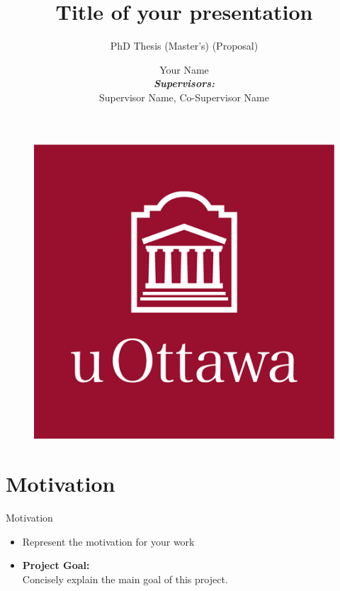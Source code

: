 \documentclass[xcolor=table]{beamer}
\author{{Your Name}\\
{\textit{\textbf{Supervisors:}}} \\
{Supervisor Name,} {Co-Supervisor Name}}
\title{Title of your presentation}
\subtitle{PhD Thesis (Master's) (Proposal)}
\institute{Department, University of Ottawa}
\begin{document}
\begin{frame}
    \titlepage
    \begin{figure}[htpb]
        \begin{center}
            \includegraphics[keepaspectratio, scale=0.08]{figs/uottawa_logo.JPG}
        \end{center}
    \end{figure}
\end{frame}
\begin{frame}
    \tableofcontents[sectionstyle=show,subsectionstyle=show/shaded/hide,subsubsectionstyle=show/shaded/hide]
\end{frame}
\section{Motivation}
\begin{frame}{Motivation}
    \begin{itemize}%
        \item Represent the motivation for your work
        \item\textbf{Project Goal:} \\
        Concisely explain the main goal of this project.
    \end{itemize}
\end{frame}
\end{document}
